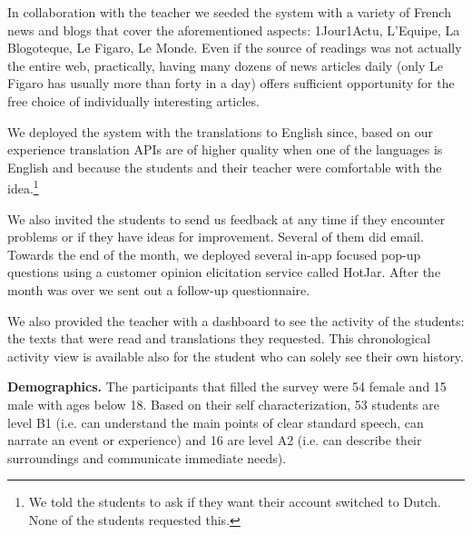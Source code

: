 In collaboration with the teacher we seeded the system with a variety of French news and blogs that cover the aforementioned aspects: 1Jour1Actu, L'Equipe, La Blogoteque, Le Figaro, Le Monde. 
% 
	Even if the source of readings was not actually the entire web, practically, having many dozens of news articles daily (only Le Figaro has usually more than forty in a day) offers sufficient opportunity for the free choice of individually interesting articles. 
	



We deployed the system with the translations to English since, based on our experience translation APIs are of higher quality when one of the languages is English and because the students and their teacher were comfortable with the idea.\footnote{We told the students to ask if they want their account switched to Dutch. None of the students requested this.}

We also invited the students to send us feedback at any time if they encounter problems or if they have ideas for improvement. Several of them did email. Towards the end of the month, we deployed several in-app focused pop-up questions using a customer opinion elicitation service called HotJar. After the month was over we sent out a follow-up questionnaire.



We also provided the teacher with a dashboard to see the activity of the students: the texts that were read and translations they requested. This chronological activity view is available also for the student who can solely see their own history.







{\bf Demographics.} 
The participants that filled the survey were 54 female and 15 male with ages below 18. Based on their self characterization, 53 students are level B1 (i.e. can understand the main points of clear standard speech, can narrate an event or experience) and 16 are level A2 (i.e. can describe their surroundings and communicate immediate needs). 


